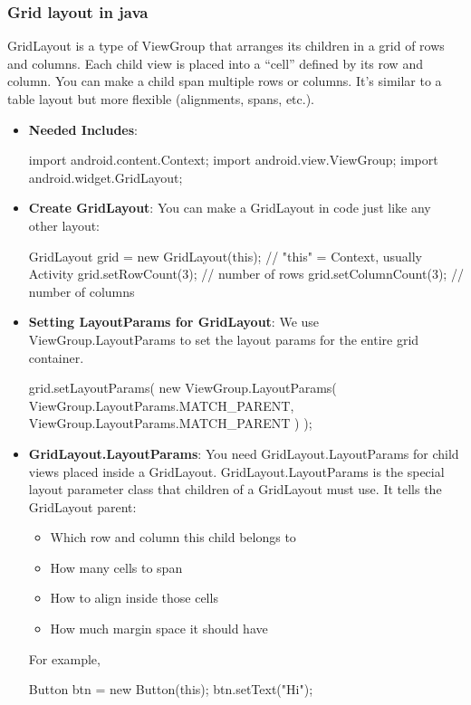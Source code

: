 \documentclass{report}
\begin{document}
    \subsubsection{Grid layout in java}
    \bigbreak \noindent 
    GridLayout is a type of ViewGroup that arranges its children in a grid of rows and columns.
    \bigbreak \noindent 
    Each child view is placed into a “cell” defined by its row and column. You can make a child span multiple rows or columns. It’s similar to a table layout but more flexible (alignments, spans, etc.).
    \begin{itemize}
        \item \textbf{Needed Includes}:
            \bigbreak \noindent 
            \begin{javacode}
                import android.content.Context;
                import android.view.ViewGroup;
                import android.widget.GridLayout;
            \end{javacode}
        \item \textbf{Create GridLayout}: You can make a GridLayout in code just like any other layout:
            \bigbreak \noindent 
            \begin{javacode}
                GridLayout grid = new GridLayout(this);   // "this" = Context, usually Activity
                grid.setRowCount(3);                      // number of rows
                grid.setColumnCount(3);                   // number of columns
            \end{javacode}
        \item \textbf{Setting LayoutParams for GridLayout}: We use ViewGroup.LayoutParams to set the layout params for the entire grid container.
            \bigbreak \noindent 
            \begin{javacode}
                grid.setLayoutParams(
                    new ViewGroup.LayoutParams(
                        ViewGroup.LayoutParams.MATCH_PARENT,
                        ViewGroup.LayoutParams.MATCH_PARENT
                    )
                );
            \end{javacode}
            
        \item \textbf{GridLayout.LayoutParams}: You need GridLayout.LayoutParams for child views placed inside a GridLayout. GridLayout.LayoutParams is the special layout parameter class that children of a GridLayout must use.
            \bigbreak \noindent 
         It tells the GridLayout parent:
            \begin{itemize}
                \item Which row and column this child belongs to
                \item How many cells to span
                \item How to align inside those cells
                \item How much margin space it should have
            \end{itemize}
            For example,
            \bigbreak \noindent 
            \begin{javacode}
                Button btn = new Button(this);
                btn.setText("Hi");


\end{javacode}
\end{itemize}
\end{document}
